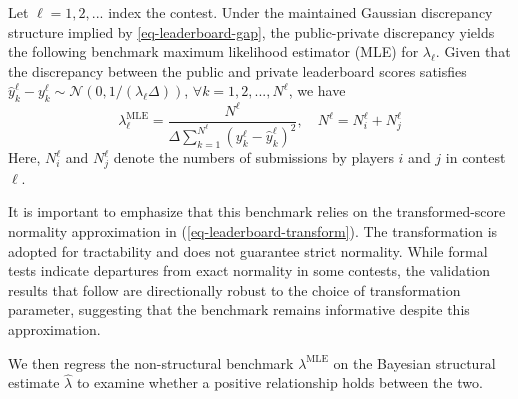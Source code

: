 \documentclass[mnsc]{informs3}
\begin{document}
Let $\ell = {1, 2, ... }$ index the contest.
Under the maintained Gaussian discrepancy structure implied by \eqref{eq-leaderboard-gap}, the public-private discrepancy yields the following benchmark maximum likelihood estimator (MLE) for $\lambda_\ell$.
Given that the discrepancy between the public and private leaderboard scores satisfies $\hat{y}_k^\ell - y_k^\ell \sim \mathcal{N}(0, 1/(\lambda_\ell\Delta))$, $\forall k = 1, 2, ..., N^\ell$, we have
\begin{equation*}
\lambda^{\text{MLE}}_\ell = \frac{N^\ell}{\Delta\sum^{N^\ell}_{k=1}(y_k^\ell - \hat{y}_k^\ell)^2}, \quad N^\ell = N^\ell_i + N^\ell_j
\end{equation*}
Here, $N^\ell_i$ and $N^\ell_j$ denote the numbers of submissions by players $i$ and $j$ in contest $\ell$.

It is important to emphasize that this benchmark relies on the transformed-score normality approximation in (\ref{eq-leaderboard-transform}).
The transformation is adopted for tractability and does not guarantee strict normality. While formal tests indicate departures from exact normality in some contests, the validation results that follow are directionally robust to the choice of transformation parameter, suggesting that the benchmark remains informative despite this approximation.

We then regress the non-structural benchmark $\lambda^{\text{MLE}}$ on the Bayesian structural estimate $\hat\lambda$ to examine whether a positive relationship holds between the two.
\end{document}
